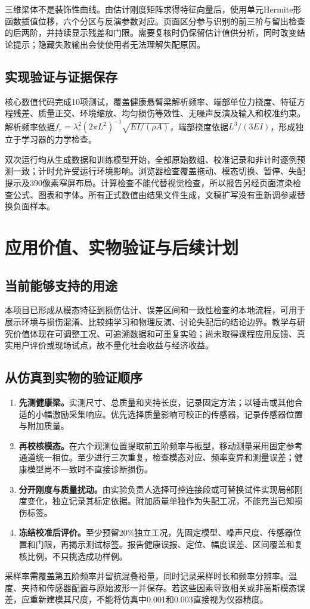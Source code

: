 \documentclass[UTF8,a4paper,11pt,fontset=fandol]{ctexart}
\begin{document}
三维梁体不是装饰性曲线。由估计刚度矩阵求得特征向量后，使用单元Hermite形函数插值位移，六个分区与反演参数对应。页面区分参与识别的前三阶与留出检查的后两阶，并持续显示残差和门限。需要复核时仍保留估计值供分析，同时改变结论提示；隐藏失败输出会使使用者无法理解失配原因。
\subsection{实现验证与证据保存}
核心数值代码完成10项测试，覆盖健康悬臂梁解析频率、端部单位力挠度、特征方程残差、质量正交、环境缩放、均匀损伤等效性、无噪声反演及输入和校准约束。解析频率依据$f_r=\lambda_r^2(2\pi L^2)^{-1}\sqrt{EI/(\rho A)}$，端部挠度依据$L^3/(3EI)$，形成独立于学习器的力学检查。

双次运行均从生成数据和训练模型开始，全部原始数组、校准记录和非计时逐例预测一致；计时允许受运行环境影响。浏览器检查覆盖拖动、模态切换、暂停、失配提示及390像素窄屏布局。计算检查不能代替视觉检查，所以报告另经页面渲染检查公式、图表和字体。所有正式数值由结果文件生成，文稿扩写没有重新调参或替换负面样本。

\newpage
\section{应用价值、实物验证与后续计划}
\subsection{当前能够支持的用途}
本项目已形成从模态特征到损伤估计、误差区间和一致性检查的本地流程，可用于展示环境与损伤混淆、比较纯学习和物理反演、讨论失配后的结论边界。教学与研究价值体现在可调整工况、可追溯数据和可重复实验；尚未取得课程应用反馈、真实用户评价或现场试点，故不量化社会收益与经济收益。
\subsection{从仿真到实物的验证顺序}
\begin{enumerate}
\item \textbf{先测健康梁。}实测尺寸、总质量和夹持长度，记录固定方法；以锤击或其他合适的小幅激励采集响应。优先选择质量影响可校正的传感器，记录传感器位置与附加质量。
\item \textbf{再校核模态。}在六个观测位置提取前五阶频率与振型，移动测量采用固定参考通道统一相位。至少进行三次重复，检查模态对应、频率变异和测量误差；健康模型尚不一致时不直接诊断损伤。
\item \textbf{分开刚度与质量扰动。}由实验负责人选择可控连接段或可替换试件实现局部刚度变化，独立记录其标定依据。附加质量单独作为失配工况，不能充当已知损伤标签。
\item \textbf{冻结校准后评价。}至少预留20\%独立工况，先固定模型、噪声尺度、传感器位置和门限，再揭示测试标签。报告健康误报、定位、幅度误差、区间覆盖和复核比例，不只挑选成功样例。
\end{enumerate}
采样率需覆盖第五阶频率并留抗混叠裕量，同时记录采样时长和频率分辨率。温度、夹持和传感器配置与原始波形一并保存。若这些因素导致相关或非高斯模态误差，应重新建模其尺度，不能将仿真中0.001和0.003直接视为仪器精度。
\end{document}
